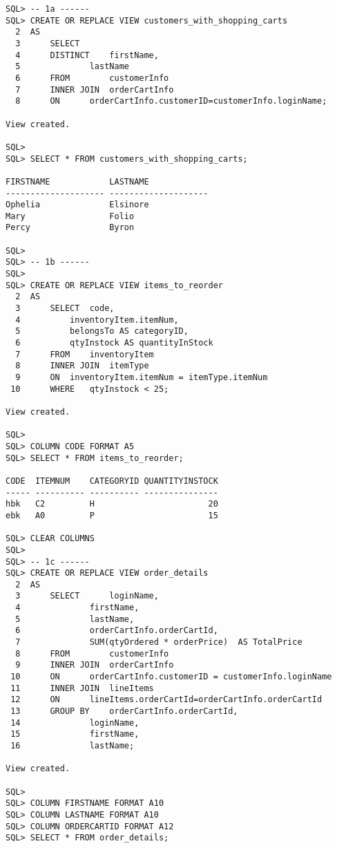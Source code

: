 \documentclass{article}
\begin{document}
\begin{lstlisting}
SQL> -- 1a ------
SQL> CREATE OR REPLACE VIEW customers_with_shopping_carts
  2  AS
  3  	 SELECT
  4  	 DISTINCT    firstName,
  5  		     lastName
  6  	 FROM	     customerInfo
  7  	 INNER JOIN  orderCartInfo
  8  	 ON	     orderCartInfo.customerID=customerInfo.loginName;

View created.

SQL> 
SQL> SELECT * FROM customers_with_shopping_carts;

FIRSTNAME            LASTNAME                                                   
-------------------- --------------------                                       
Ophelia              Elsinore                                                   
Mary                 Folio                                                      
Percy                Byron                                                      

SQL> 
SQL> -- 1b ------
SQL> 
SQL> CREATE OR REPLACE VIEW items_to_reorder
  2  AS
  3  	 SELECT  code,
  4  		 inventoryItem.itemNum,
  5  		 belongsTo AS categoryID,
  6  		 qtyInstock AS quantityInStock
  7  	 FROM	 inventoryItem
  8  	 INNER JOIN  itemType
  9  	 ON	 inventoryItem.itemNum = itemType.itemNum
 10  	 WHERE	 qtyInstock < 25;

View created.

SQL> 
SQL> COLUMN CODE FORMAT A5
SQL> SELECT * FROM items_to_reorder;

CODE  ITEMNUM    CATEGORYID QUANTITYINSTOCK                                     
----- ---------- ---------- ---------------                                     
hbk   C2         H                       20                                     
ebk   A0         P                       15                                     

SQL> CLEAR COLUMNS
SQL> 
SQL> -- 1c ------
SQL> CREATE OR REPLACE VIEW order_details
  2  AS
  3  	 SELECT      loginName,
  4  		     firstName,
  5  		     lastName,
  6  		     orderCartInfo.orderCartId,
  7  		     SUM(qtyOrdered * orderPrice)  AS TotalPrice
  8  	 FROM	     customerInfo
  9  	 INNER JOIN  orderCartInfo
 10  	 ON	     orderCartInfo.customerID = customerInfo.loginName
 11  	 INNER JOIN  lineItems
 12  	 ON	     lineItems.orderCartId=orderCartInfo.orderCartId
 13  	 GROUP BY    orderCartInfo.orderCartId,
 14  		     loginName,
 15  		     firstName,
 16  		     lastName;

View created.

SQL> 
SQL> COLUMN FIRSTNAME FORMAT A10
SQL> COLUMN LASTNAME FORMAT A10
SQL> COLUMN ORDERCARTID FORMAT A12
SQL> SELECT * FROM order_details;


\end{lstlisting}
\end{document}
